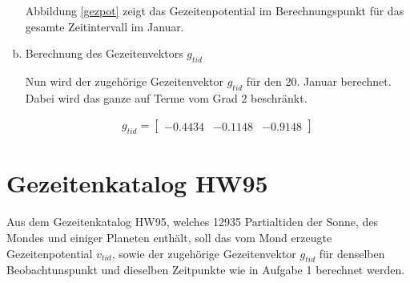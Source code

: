 \begin{enumerate}[a)]
Abbildung \ref{gezpot} zeigt das Gezeitenpotential im Berechnungspunkt für das gesamte Zeitintervall im Januar. 

\item Berechnung des Gezeitenvektors $g_{tid}$

Nun wird der zugehörige Gezeitenvektor $g_{tid}$ für den 20. Januar berechnet. Dabei wird das ganze auf Terme vom Grad 2 beschränkt. 

\begin{gather*}
g_{tid} = \begin{bmatrix}
-0.4434 &-0.1148 &-0.9148
\end{bmatrix}
\end{gather*}
\end{enumerate}

\section{Gezeitenkatalog HW95}

Aus dem Gezeitenkatalog HW95, welches 12935 Partialtiden der Sonne, des Mondes und einiger Planeten enthält, soll das vom Mond erzeugte Gezeitenpotential $v_{tid}$, sowie der zugehörige Gezeitenvektor $g_{tid}$ für denselben Beobachtunspunkt und dieselben Zeitpunkte wie in Aufgabe 1 berechnet werden. 

